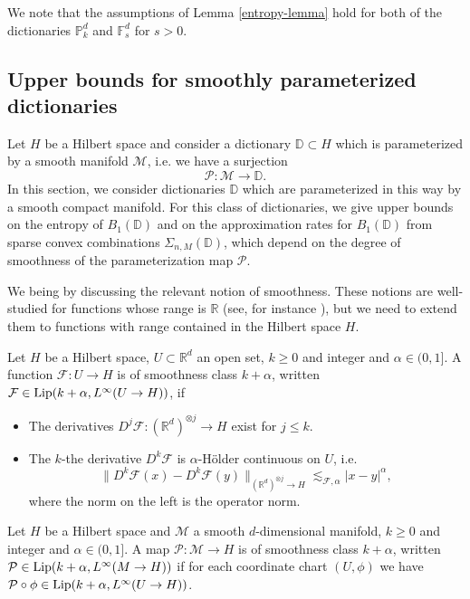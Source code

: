 We note that the assumptions of Lemma \ref{entropy-lemma} hold for both of the dictionaries $\mathbb{P}^d_k$ and $\mathbb{F}^d_s$ for $s > 0$.

\subsection{Upper bounds for smoothly parameterized dictionaries}\label{main-result-1-section}
Let $H$ be a Hilbert space and consider a dictionary $\mathbb{D}\subset H$ which is parameterized by a smooth manifold $\mathcal{M}$, i.e. we have a surjection
\begin{equation}
 \mathcal{P}:\mathcal{M}\rightarrow \mathbb{D}.
\end{equation}
In this section, we consider dictionaries $\mathbb{D}$ which are parameterized in this way by a smooth compact manifold. For this class of dictionaries, we give upper bounds on the entropy of $B_1(\mathbb{D})$ and on the approximation rates for $B_1(\mathbb{D})$ from sparse convex combinations $\Sigma_{n,M}(\mathbb{D})$, which depend on the degree of smoothness of the parameterization map $\mathcal{P}$.

We being by discussing the relevant notion of smoothness. These notions are well-studied for functions whose range is $\mathbb{R}$ (see, for instance \cite{lorentz1996constructive}), but we need to extend them to functions with range contained in the Hilbert space $H$.
\begin{definition}
 Let $H$ be a Hilbert space, $U\subset \mathbb{R}^d$ an open set, $k \geq 0$ and integer and $\alpha\in (0,1]$. A function $\mathcal{F}:U\rightarrow H$ is of smoothness class $k+\alpha$, written $\mathcal{F}\in {\rm Lip}(k+\alpha, L^\infty(U\rightarrow H))$, if
 \begin{itemize}
  \item The derivatives $D^j\mathcal{F}:(\mathbb{R}^d)^{\otimes j}\rightarrow H$ exist for $j\leq k$.
  \item The $k$-the derivative $D^k\mathcal{F}$ is $\alpha$-H\"older continuous on $U$, i.e.
  $$
  \|D^k\mathcal{F}(x) - D^k\mathcal{F}(y)\|_{(\mathbb{R}^d)^{\otimes j}\rightarrow H} \lesssim_{\mathcal{F},\alpha} |x-y|^\alpha,
  $$
  where the norm on the left is the operator norm.
 \end{itemize}

\end{definition}

\begin{definition}
 Let $H$ be a Hilbert space and $\mathcal{M}$ a smooth $d$-dimensional manifold, $k \geq 0$ and integer and $\alpha\in (0,1]$. A map $\mathcal{P}:\mathcal{M}\rightarrow H$ is of smoothness class $k+\alpha$, written $\mathcal{P}\in {\rm Lip}(k+\alpha, L^\infty(M\rightarrow H))$ if for each coordinate chart $(U,\phi)$ we have $\mathcal{P}\circ \phi\in {\rm Lip}(k+\alpha, L^\infty(U\rightarrow H))$. 
 \end{definition}
 
